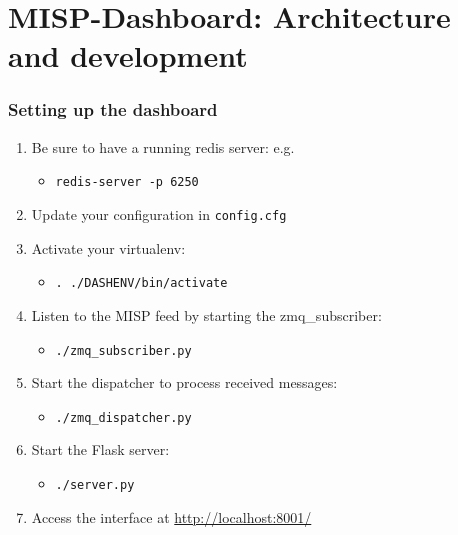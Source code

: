\section{MISP-Dashboard: Architecture and development}
\lstset{style=bash}
\begin{frame}[fragile]
\frametitle{Setting up the dashboard}
\begin{enumerate}
    \item Be sure to have a running redis server: e.g.
        \begin{itemize}
            \item \texttt{redis-server -p 6250}
        \end{itemize}
    \item Update your configuration in \texttt{config.cfg}
    \item Activate your virtualenv:
        \begin{itemize}
            \item \texttt{. ./DASHENV/bin/activate}
        \end{itemize}
    \item Listen to the MISP feed by starting the zmq\_subscriber:
        \begin{itemize}
            \item \texttt{./zmq\_subscriber.py}
        \end{itemize}
    \item Start the dispatcher to process received messages:
        \begin{itemize}
            \item \texttt{./zmq\_dispatcher.py}
        \end{itemize}
    \item Start the Flask server:
        \begin{itemize}
            \item \texttt{./server.py}
        \end{itemize}
    \item Access the interface at \url{http://localhost:8001/}
\end{enumerate}
\end{frame}

